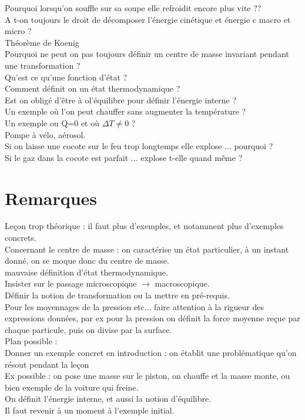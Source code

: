\documentclass[12pt,prb,aps,epsf]{report}
\begin{document}
Pourquoi lorsqu'on souffle sur sa soupe elle refroidit encore plus vite ??\\

A t-on toujours le droit de décomposer l'énergie cinétique et énergie c macro et micro ?\\
Théorème de Koenig\\

Pourquoi ne peut on pas toujours définir un centre de masse invariant pendant une transformation ?\\

Qu'est ce qu'une fonction d'état ?\\

Comment définit on un état thermodynamique ?\\

Est on obligé d'être à ol'équilibre pour définir l'énergie interne ?\\

Un exemple où l'on peut chauffer sans augmenter la température ?\\
Un exemple ou Q=0 et où $\Delta T \neq 0$ ?\\
Pompe à vélo, aérosol.\\

Si on laisse une cocote sur le feu trop longtemps elle explose ... pourquoi ?\\ Si le gaz dans la cocote est parfait ... explose t-elle quand même ?\\

\section*{Remarques}
Leçon trop théorique : il faut plus d'exemples, et notamment plus d'exemples concrets.\\
Concernant le centre de masse : on caractérise un état particulier, à un instant donné, on se moque donc du centre de masse.\\
mauvaise définition d'état thermodynamique.\\
Insister sur le passage microscopique $\rightarrow$ macroscopique.\\
Définir la notion de transformation ou la mettre en pré-requis.\\
Pour les moyennages de la pression etc... faire attention à la rigueur des expressions données, par ex pour la pression on définit la force moyenne reçue par chaque particule, puis on divise par la surface.\\

Plan possible :\\

Donner un exemple concret en introduction : on établit une problématique qu'on résout pendant la leçon\\
Ex possible : on pose une masse sur le piston, on chauffe et la masse monte, ou bien exemple de la voiture qui freine.\\

On définit l'énergie interne, et aussi la notion d'équilibre.\\

Il faut revenir à un moment à l'exemple initial.
\end{document}
